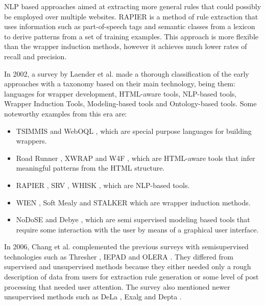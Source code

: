 \documentclass[sigconf]{acmart}
\begin{document}
NLP based approaches aimed at extracting more general rules that could possibly
be employed over multiple websites. RAPIER \cite{Califf1999} is a method of rule
extraction that uses information such as part-of-speech tags and semantic classes from
a lexicon to derive patterns from a set of training examples. This approach is more
flexible than the wrapper induction methods, however it achieves much lower rates of 
recall and precision.

In 2002, a survey by Laender et al. \cite{Laender2002} made a thorough classification of the
early approaches with a taxonomy based on their main technology, being them: languages for
wrapper development, HTML-aware tools, NLP-based tools, Wrapper Induction Tools,
Modeling-based tools and Ontology-based tools. Some noteworthy examples from this era
are: 

\begin{itemize}
\item TSIMMIS \cite{Hammer1997} and WebOQL \cite{Arocena1999}, which are special purpose 
languages for building wrappers.

\item Road Runner \cite{Crescenzi2001}, XWRAP \cite{Liu2000} and W4F \cite{Sahuguet1999}, 
which are HTML-aware tools that infer meaningful patterns from the HTML structure.

\item RAPIER \cite{Califf1999}, SRV \cite{Freitag1998}, WHISK \cite{Soderland1999}, which 
are NLP-based tools.

\item WIEN \cite{Kushmerick2000}, Soft Mealy \cite{Hsu1998} and STALKER \cite{Muslea1999} which 
are wrapper induction methods.

\item NoDoSE \cite{Adelberg1998} and Debye \cite{Laender2002a}, which are semi supervised modeling
based tools that require some interaction with the user by means of a graphical
user interface.
\end{itemize}

In 2006, Chang et al. \cite{Chang2006} complemented the previous surveys with semisupervised 
technologies such as Thresher \cite{Hogue2005}, IEPAD \cite{Chang2001} and 
OLERA \cite{Chang2004}. They differed from supervised 
and unsupervised methods because they either needed only a rough description of
data from users for extraction rule generation or some level of post processing
that needed user attention. The survey also mentioned newer unsupervised methods
such as DeLa \cite{Wang2003}, Exalg \cite{Arasu2003} and Depta \cite{Zhai2005}.
\end{document}
